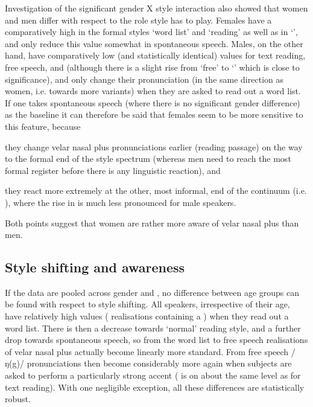 Investigation of the significant gender X style interaction also showed that women and men differ with respect to the role style has to play.
Females have a comparatively high  in the formal styles `word list' and `reading' as well as in `', and only reduce this value somewhat in spontaneous speech.
Males, on the other hand, have comparatively low (and statistically identical) values for text reading, free speech, and  (although there is a slight rise from `free' to `' which is close to significance), and only change their pronunciation (in the same direction as women, i.e. towards more  variants) when they are asked to read out a word list.
If one takes spontaneous speech (where there is no significant gender difference) as the baseline it can therefore be said that females seem to be more sensitive to this feature, because
\begin{inparaenum}[(a)]
	\item they change velar nasal plus pronunciations earlier (reading passage) on the way to the formal end of the style spectrum (whereas men need to reach the most formal register before there is any linguistic reaction), and
	\item they react more extremely at the other, most informal, end of the continuum (i.e. ), where the rise in  is much less pronounced for male speakers.
\end{inparaenum}
Both points suggest that women are rather more aware of velar nasal plus than men.

\subsection{Style shifting and awareness}
\label{prod.disc.ng.style}

If the data are pooled across gender and , no difference between age groups can be found with respect to style shifting.
All speakers, irrespective of their age, have relatively high  values ( realisations containing a ) when they read out a word list.
There is then a decrease towards `normal' reading style, and a further drop towards spontaneous speech, so from the word list to free speech realisations of velar nasal plus actually become linearly more standard.
From free speech /ŋ(g)/ pronunciations then become considerably more  again when subjects are asked to perform a particularly strong  accent ( is on about the same level as for text reading).
With one negligible exception, all these differences are statistically robust.

